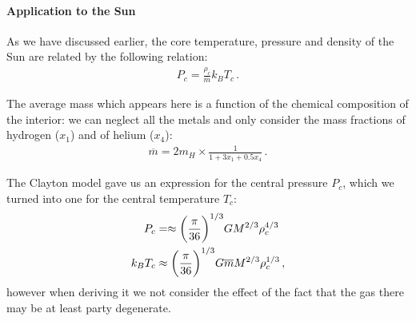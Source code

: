 \documentclass[main.tex]{subfiles}
\begin{document}


\paragraph{Application to the Sun}

As we have discussed earlier, the core temperature, pressure and density of the Sun are related by the following relation:
%
\begin{align}
  P_c = \frac{\rho _c}{\overline{m}} k_B T_c
\,.
\end{align}

The average mass which appears here is a function of the chemical composition of the interior: we can neglect all the metals and only consider the mass fractions of hydrogen (\(x_1 \)) and of helium (\(x_4 \)): 
%
\begin{align}
  \overline{m} = 2 m_H \times \frac{1}{1 + 3x_1 + 0.5 x_4}
\,.
\end{align}
%


The Clayton model gave us an expression for the central pressure \(P_c\), which we turned into one for the central temperature \(T_c\): 
%
\begin{align}
P_c &=\approx \qty(\frac{\pi }{36})^{1/3} G M^{2/3} \rho _c^{4/3} \\
 k_B T_c &\approx \qty(\frac{\pi }{36})^{1/3} G \overline{m}
  M^{2/3} \rho _c^{1/3}
\,,
\end{align}
%
however when deriving it we not consider the effect of the fact that the gas there may be at least party degenerate.
\end{document}
